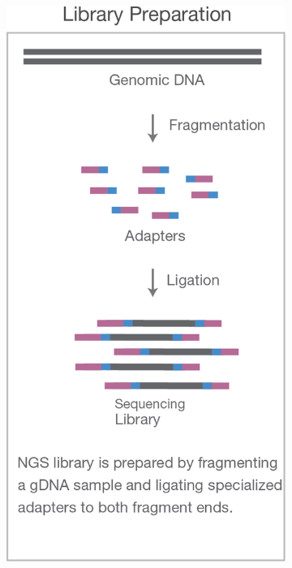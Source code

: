 \begin{figure}[htb]
    \centering
    \begin{subfigure}{0.25\textwidth}
        \includegraphics[width=\linewidth,keepaspectratio]{images/intro/illumina_library_prep}
        \caption{}\label{fig:intro:library_prep}

\end{subfigure}
\end{figure}
